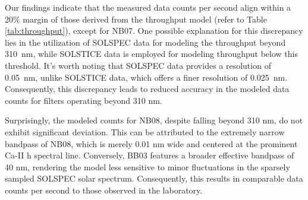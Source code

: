 Our findings indicate that the measured data counts per second align within a 20\% margin of those derived from the throughput model (refer to Table \ref{tab:throughput}), except for NB07. One possible explanation for this discrepancy lies in the utilization of SOLSPEC data for modeling the throughput beyond 310~nm, while SOLSTICE data is employed for modeling throughput below this threshold. It's worth noting that SOLSPEC data provides a resolution of 0.05~nm, unlike SOLSTICE data, which offers a finer resolution of 0.025~nm. Consequently, this discrepancy leads to reduced accuracy in the modeled data counts for filters operating beyond 310 nm.

\begin{table}[ht]
\begin{center}
\end{center}
\caption{Comparison of the data numbers derived from throughput model (using SOLSTICE and SOLSPEC data) with the data numbers inferred from the measurements.} 
\label{tab:throughput}
\end{table}

Surprisingly, the modeled counts for NB08, despite falling beyond 310 nm, do not exhibit significant deviation. This can be attributed to the extremely narrow bandpass of NB08, which is merely 0.01 nm wide and centered at the prominent Ca-II h spectral line. Conversely, BB03 features a broader effective bandpass of 40 nm, rendering the model less sensitive to minor fluctuations in the sparsely sampled SOLSPEC solar spectrum. Consequently, this results in comparable data counts per second to those observed in the laboratory.

